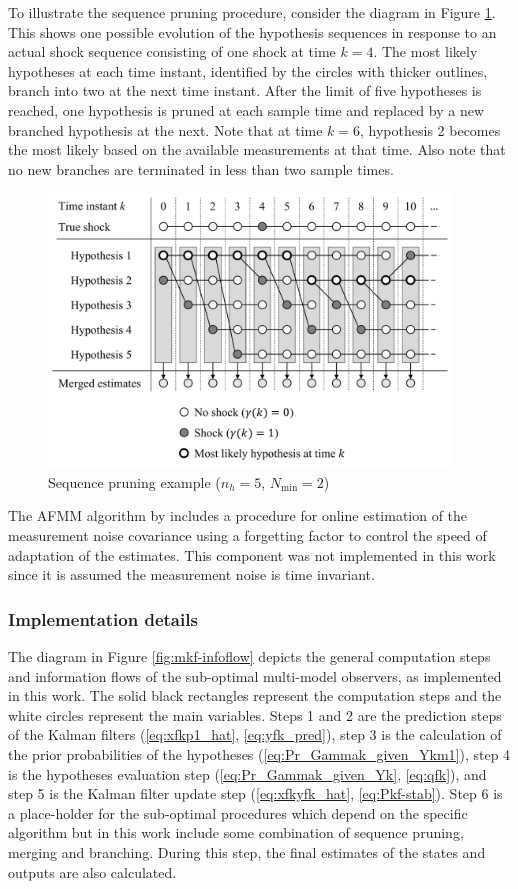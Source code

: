 {To illustrate the sequence pruning procedure, consider the diagram in Figure \ref{fig:mm-obs-seq-SP}. This shows one possible evolution of the hypothesis sequences in response to an actual shock sequence consisting of one shock at time $k=4$.  The most likely hypotheses at each time instant, identified by the circles with thicker outlines, branch into two at the next time instant. After the limit of five hypotheses is reached, one hypothesis is pruned at each sample time and replaced by a new branched hypothesis at the next. Note that at time $k=6$, hypothesis 2 becomes the most likely based on the available measurements at that time. Also note that no new branches are terminated in less than two sample times.

\begin{figure}[htp]
	\centering
	\includegraphics[width=10.7cm]{images/mm_obs_seq_SP.pdf}
	\caption{Sequence pruning example ($n_h=5$, $N_\text{min}=2$)}
	\label{fig:mm-obs-seq-SP}
\end{figure}

The \gls{AFMM} algorithm by \cite{gustafsson_estimation_1993} includes a procedure for online estimation of the measurement noise covariance using a forgetting factor to control the speed of adaptation of the estimates. This component was not implemented in this work since it is assumed the measurement noise is time invariant.

\subsubsection{Implementation details} \label{subsec-implementation}

The diagram in Figure \ref{fig:mkf-infoflow} depicts the general computation steps and information flows of the sub-optimal multi-model observers, as implemented in this work. The solid black rectangles represent the computation steps and the white circles represent the main variables. Steps 1 and 2 are the prediction steps of the Kalman filters (\ref{eq:xfkp1_hat}, \ref{eq:yfk_pred}), step 3 is the calculation of the prior probabilities of the hypotheses (\ref{eq:Pr_Gammak_given_Ykm1}), step 4 is the hypotheses evaluation step (\ref{eq:Pr_Gammak_given_Yk}, \ref{eq:qfk}), and step 5 is the Kalman filter update step (\ref{eq:xfkyfk_hat}, \ref{eq:Pkf-stab}). Step 6 is a place-holder for the sub-optimal procedures which depend on the specific algorithm but in this work include some combination of sequence pruning, merging and branching. During this step, the final estimates of the states and outputs are also calculated.

}
